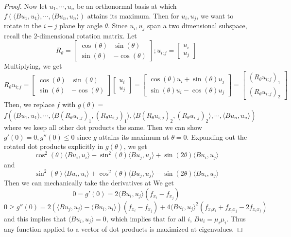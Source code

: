 \begin{proof}
Now let $u_1, \cdots, u_n$ be an orthonormal basis at which $f(\langle Bu_1, u_1 \rangle, \cdots, \langle Bu_n, u_n\rangle)$ attains its maximum. Then for $u_i, u_j$, we want to rotate in the $i-j$ plane by angle $\theta$. Since $u_i, u_j$ span a two dimensional subspace, recall the $2$-dimensional rotation matrix.
Let 
\[
R_{\theta} = 
\begin{bmatrix}
\cos(\theta) & \sin(\theta) \\
\sin(\theta) & -\cos(\theta)
\end{bmatrix}; 
u_{i;j} = 
\begin{bmatrix}
u_i \\
u_j
\end{bmatrix}
\]
Multiplying, we get
\[
R_{\theta}u_{i;j} = 
\begin{bmatrix}
\cos(\theta) & \sin(\theta) \\
\sin(\theta) & -\cos(\theta)
\end{bmatrix}
\begin{bmatrix}
u_i \\
u_j
\end{bmatrix}
= 
\begin{bmatrix}
\cos(\theta)u_i + \sin(\theta)u_j \\
\sin(\theta)u_i -\cos(\theta)u_j
\end{bmatrix}
= 
\begin{bmatrix}
\left(R_{\theta}u_{i;j}\right)_1 \\
\left(R_{\theta}u_{i;j}\right)_2
\end{bmatrix}
\] 
Then, we replace $f$ with $g(\theta) =$ %
\[
f\left(\langle Bu_1, u_1 \rangle, \cdots, \langle B\left(R_{\theta}u_{i;j}\right)_1, \left(R_{\theta}u_{i;j}\right)_1 \rangle, \langle B\left(R_{\theta}u_{i;j}\right)_2, \left(R_{\theta}u_{i;j}\right)_2\rangle, \cdots, \langle Bu_n, u_n \rangle\right)
\] 
where we keep all other dot products the same. 
Then we can show $g'(0) = 0, g''(0) \leq 0$ since $g$ attains its maximum at $\theta = 0$. Expanding out the rotated dot products explicitly in $g(\theta)$, we get 
\[
\cos^2(\theta)\langle Bu_i, u_i\rangle + \sin^2(\theta)\langle Bu_j, u_j \rangle + \sin(2\theta)\langle Bu_i, u_j \rangle
\]
and
\[
\sin^2(\theta)\langle Bu_i, u_i\rangle + \cos^2(\theta)\langle Bu_j, u_j \rangle - \sin(2\theta)\langle Bu_i, u_j \rangle
\]
Then we can mechanically take the derivatives at  %
We get 
\[
0 = g'(0) = 2\langle Bu_i, u_j \rangle (f_{x_i} - f_{x_j})
\]
\[
0 \geq g''(0) = 2\left(\langle Bu_j, u_j\rangle - \langle Bu_i, u_i \rangle\right)(f_{x_i} - f_{x_j}) + 4\langle Bu_i, u_j\rangle^2\left(f_{x_ix_i} + f_{x_jx_j} - 2f_{x_ix_j}\right)
\]
and this implies that $\langle Bu_i, u_j \rangle = 0$, which implies that for all $i$, $Bu_i = \mu_i\mu_i$. Thus any function applied to a vector of dot products is maximized at eigenvalues. 
\end{proof}

